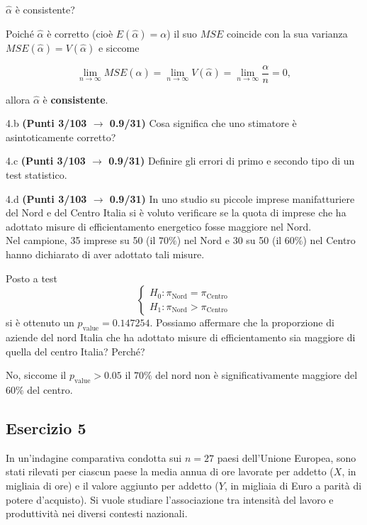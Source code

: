 \documentclass[
  11pt,
]{book}
\theoremstyle{mytheoremstyle}
\theoremstyle{mydefstyle}
\newenvironment{sol}
  {
  \begin{tcolorbox}[enhanced,breakable,arc=0.1mm,boxrule=1pt,colback=white,colframe=iblue,
  title=\bf \fontfamily{lmss}\selectfont \hspace{.5 cm} Soluzione,drop fuzzy shadow]

}{
\end{tcolorbox}
  }
\begin{document}
\(\hat\alpha\) è consistente?

\begin{sol}
Poiché \(\hat\alpha\) è corretto (cioè \(E(\hat\alpha) = \alpha\))
il suo \(MSE\) coincide con la sua varianza \(MSE(\hat\alpha)=V(\hat\alpha)\) e siccome

\[
\lim_{n \to \infty} MSE(\hat\alpha)=\lim_{n \to \infty} V(\hat\alpha) = \lim_{n \to \infty} \frac{\alpha}{n} = 0,
\]

allora \(\hat\alpha\) è \textbf{consistente}.

\end{sol}

4.b \textbf{(Punti 3/103 \(\rightarrow\) 0.9/31)} Cosa significa che uno stimatore è asintoticamente corretto?

4.c \textbf{(Punti 3/103 \(\rightarrow\) 0.9/31)} Definire gli errori di primo e secondo tipo di un test statistico.

4.d \textbf{(Punti 3/103 \(\rightarrow\) 0.9/31)} In uno studio su piccole imprese manifatturiere del Nord e del Centro Italia si è voluto verificare se la quota di imprese che ha adottato misure di efficientamento energetico fosse maggiore nel Nord.\\
Nel campione, 35 imprese su 50 (il \(70\%\)) nel Nord e 30 su 50 (il \(60\%\)) nel Centro hanno dichiarato di aver adottato tali misure.

Posto a test
\[
\begin{cases}
H_0: \pi_\text{Nord} = \pi_\text{Centro} \\
H_1: \pi_\text{Nord} > \pi_\text{Centro}
\end{cases}
\]
si è ottenuto un \(p_\text{value} = 0.147254\). Possiamo affermare che la proporzione di aziende del nord Italia che ha adottato misure di efficientamento sia maggiore di quella del centro Italia? Perché?

\begin{sol}
No, siccome il \(p_\text{value}>0.05\) il \(70\%\) del nord non è significativamente maggiore del \(60\%\) del centro.

\end{sol}

\subsection{Esercizio 5}\label{esercizio-5-43}

In un'indagine comparativa condotta sui \(n = 27\) paesi dell'Unione Europea, sono stati rilevati per ciascun paese la media annua di ore lavorate per addetto (\(X\), in migliaia di ore) e il valore aggiunto per addetto (\(Y\), in migliaia di Euro a parità di potere d'acquisto). Si vuole studiare l'associazione tra intensità del lavoro e produttività nei diversi contesti nazionali.
\end{document}

